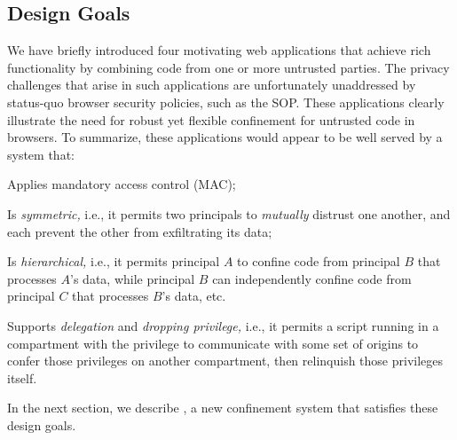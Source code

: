 
\subsection{Design Goals}

We have briefly introduced four motivating web applications that
achieve rich functionality by combining code from one or more
untrusted parties. The privacy challenges that arise in such
applications are unfortunately unaddressed by status-quo browser
security policies, such as the SOP. These applications clearly
illustrate the need for robust yet flexible confinement for untrusted
code in browsers. To summarize, these applications would appear to be
well served by a system that:
\begin{CompactItemize}
\item Applies mandatory access control (MAC);
\item Is {\em symmetric,} i.e., it permits two principals to {\em
    mutually} distrust one another, and each prevent the other from
  exfiltrating its data;
\item Is {\em hierarchical, } i.e., it permits principal
  $A$ to confine code from principal $B$ that processes $A$'s data,
  while principal $B$ can independently confine code from principal
  $C$ that processes $B$'s data, etc.
\item Supports {\em delegation} and {\em dropping privilege,} i.e., it
  permits a script running in a compartment with the privilege to
  communicate with some set of origins to confer those privileges
  on another compartment, then relinquish those privileges itself.
\end{CompactItemize}
In the next section, we describe \sys{}, a new confinement system that
satisfies these design goals.
